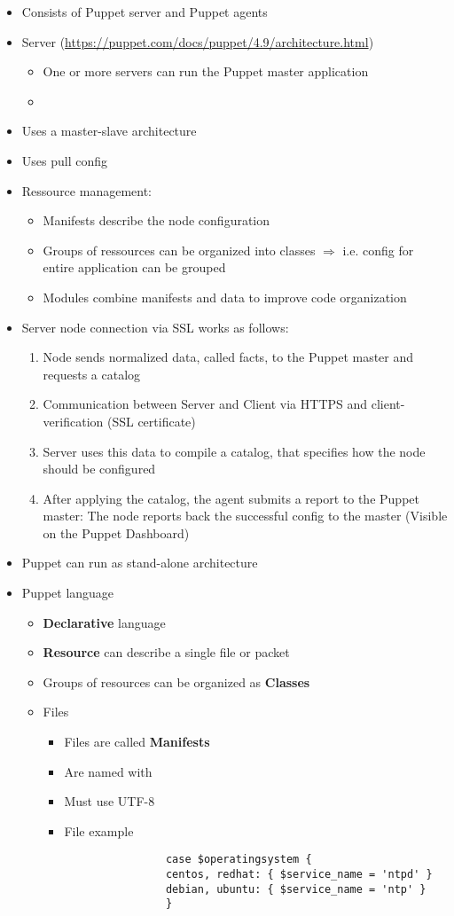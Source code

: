 	\begin{itemize}
		\item Consists of Puppet server and Puppet agents
		\item Server (\url{https://puppet.com/docs/puppet/4.9/architecture.html})
		\begin{itemize}
			\item One or more servers can run the Puppet master application
			\item 
		\end{itemize}
		\item Uses a master-slave architecture
		\item Uses pull config
		\item Ressource management:
		\begin{itemize}
			\item Manifests describe the node configuration
			\item Groups of ressources can be organized into classes $\Rightarrow$ i.e. config for entire application can be grouped
			\item Modules combine manifests and data to improve code organization
		\end{itemize}
		\item Server node connection via SSL works as follows:
		\begin{enumerate}
			\item Node sends normalized data, called facts, to the Puppet master and requests a catalog
			\item Communication between Server and Client via HTTPS and client-verification (SSL certificate)
			\item Server uses this data to compile a catalog, that specifies how the node should be configured
			\item After applying the catalog, the agent submits a report to the Puppet master: The node reports back the successful config to the master (Visible on the Puppet Dashboard)
		\end{enumerate}
		\item Puppet can run as stand-alone architecture
		\item Puppet language
		\begin{itemize}
			\item \textbf{Declarative} language
			\item \textbf{Resource} can describe a single file or packet
			\item Groups of resources can be organized as \textbf{Classes}
			\item Files
			\begin{itemize}
				\item Files are called \textbf{Manifests}
				\item Are named with 
				\item Must use UTF-8
				\item File example\\
				\begin{verbatim}
				case $operatingsystem {
				centos, redhat: { $service_name = 'ntpd' }
				debian, ubuntu: { $service_name = 'ntp' }
				}
				

\end{verbatim}
\end{itemize}
\end{itemize}
\end{itemize}

